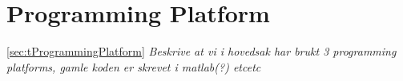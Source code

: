 \section{Programming Platform}
\ref{sec:tProgrammingPlatform}
\textit{Beskrive at vi i hovedsak har brukt 3 programming platforms, gamle koden er skrevet i matlab(?) etcetc}



